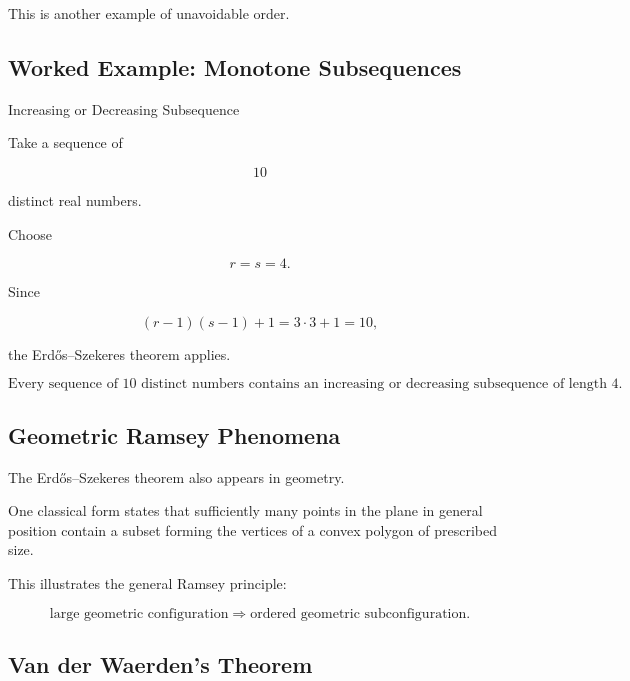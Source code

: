 This is another example of unavoidable order.

\subsection{Worked Example: Monotone Subsequences}
\label{subsec:worked-erdos-szekeres}

\begin{workedexamplebox}{Increasing or Decreasing Subsequence}

Take a sequence of

\[
10
\]

distinct real numbers.

Choose

\[
r=s=4.
\]

Since

\[
(r-1)(s-1)+1
=
3\cdot3+1
=
10,
\]

the Erd\H{o}s--Szekeres theorem applies.

\begin{answerbox}
\[
\boxed{
\text{Every sequence of }10\text{ distinct numbers contains an
increasing or decreasing subsequence of length }4.
}
\]
\end{answerbox}

\end{workedexamplebox}

\subsection{Geometric Ramsey Phenomena}
\label{subsec:geometric-ramsey}

The Erd\H{o}s--Szekeres theorem also appears in geometry.

One classical form states that sufficiently many points in the plane in
general position contain a subset forming the vertices of a convex
polygon of prescribed size.

This illustrates the general Ramsey principle:

\[
\boxed{
\text{large geometric configuration}
\Longrightarrow
\text{ordered geometric subconfiguration}.
}
\]

\subsection{Van der Waerden's Theorem}
\label{subsec:van-der-waerden}

